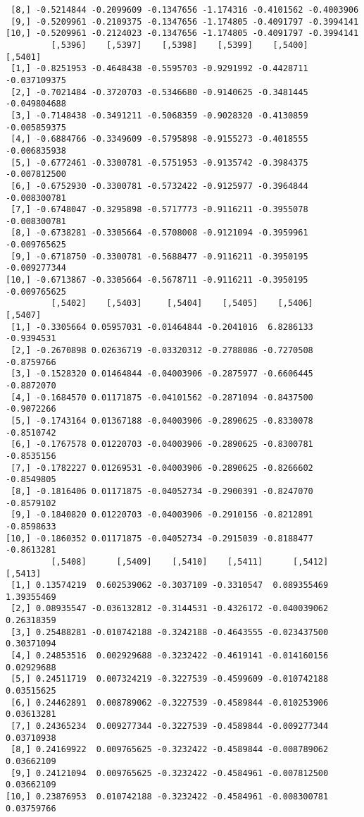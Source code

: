 \documentclass[
  letterpaper,
  DIV=11,
  numbers=noendperiod]{scrreprt}
\begin{document}
\begin{verbatim}
 [8,] -0.5214844 -0.2099609 -0.1347656 -1.174316 -0.4101562 -0.4003906
 [9,] -0.5209961 -0.2109375 -0.1347656 -1.174805 -0.4091797 -0.3994141
[10,] -0.5209961 -0.2124023 -0.1347656 -1.174805 -0.4091797 -0.3994141
         [,5396]    [,5397]    [,5398]    [,5399]    [,5400]      [,5401]
 [1,] -0.8251953 -0.4648438 -0.5595703 -0.9291992 -0.4428711 -0.037109375
 [2,] -0.7021484 -0.3720703 -0.5346680 -0.9140625 -0.3481445 -0.049804688
 [3,] -0.7148438 -0.3491211 -0.5068359 -0.9028320 -0.4130859 -0.005859375
 [4,] -0.6884766 -0.3349609 -0.5795898 -0.9155273 -0.4018555 -0.006835938
 [5,] -0.6772461 -0.3300781 -0.5751953 -0.9135742 -0.3984375 -0.007812500
 [6,] -0.6752930 -0.3300781 -0.5732422 -0.9125977 -0.3964844 -0.008300781
 [7,] -0.6748047 -0.3295898 -0.5717773 -0.9116211 -0.3955078 -0.008300781
 [8,] -0.6738281 -0.3305664 -0.5708008 -0.9121094 -0.3959961 -0.009765625
 [9,] -0.6718750 -0.3300781 -0.5688477 -0.9116211 -0.3950195 -0.009277344
[10,] -0.6713867 -0.3305664 -0.5678711 -0.9116211 -0.3950195 -0.009765625
         [,5402]    [,5403]     [,5404]    [,5405]    [,5406]    [,5407]
 [1,] -0.3305664 0.05957031 -0.01464844 -0.2041016  6.8286133 -0.9394531
 [2,] -0.2670898 0.02636719 -0.03320312 -0.2788086 -0.7270508 -0.8759766
 [3,] -0.1528320 0.01464844 -0.04003906 -0.2875977 -0.6606445 -0.8872070
 [4,] -0.1684570 0.01171875 -0.04101562 -0.2871094 -0.8437500 -0.9072266
 [5,] -0.1743164 0.01367188 -0.04003906 -0.2890625 -0.8330078 -0.8510742
 [6,] -0.1767578 0.01220703 -0.04003906 -0.2890625 -0.8300781 -0.8535156
 [7,] -0.1782227 0.01269531 -0.04003906 -0.2890625 -0.8266602 -0.8549805
 [8,] -0.1816406 0.01171875 -0.04052734 -0.2900391 -0.8247070 -0.8579102
 [9,] -0.1840820 0.01220703 -0.04003906 -0.2910156 -0.8212891 -0.8598633
[10,] -0.1860352 0.01171875 -0.04052734 -0.2915039 -0.8188477 -0.8613281
         [,5408]      [,5409]    [,5410]    [,5411]      [,5412]    [,5413]
 [1,] 0.13574219  0.602539062 -0.3037109 -0.3310547  0.089355469 1.39355469
 [2,] 0.08935547 -0.036132812 -0.3144531 -0.4326172 -0.040039062 0.26318359
 [3,] 0.25488281 -0.010742188 -0.3242188 -0.4643555 -0.023437500 0.30371094
 [4,] 0.24853516  0.002929688 -0.3232422 -0.4619141 -0.014160156 0.02929688
 [5,] 0.24511719  0.007324219 -0.3227539 -0.4599609 -0.010742188 0.03515625
 [6,] 0.24462891  0.008789062 -0.3227539 -0.4589844 -0.010253906 0.03613281
 [7,] 0.24365234  0.009277344 -0.3227539 -0.4589844 -0.009277344 0.03710938
 [8,] 0.24169922  0.009765625 -0.3232422 -0.4589844 -0.008789062 0.03662109
 [9,] 0.24121094  0.009765625 -0.3232422 -0.4584961 -0.007812500 0.03662109
[10,] 0.23876953  0.010742188 -0.3232422 -0.4584961 -0.008300781 0.03759766

\end{verbatim}
\end{document}
